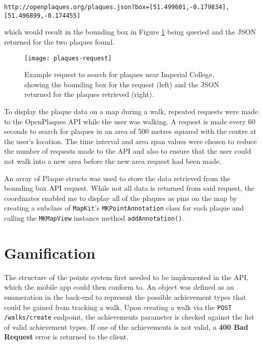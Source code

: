 \vspace{-0.5cm}
\begin{center}
  \verb|http://openplaques.org/plaques.json?box=[51.499601,-0.179834],[51.496899,-0.174455]|
\end{center}

which would result in the bounding box in Figure \ref{fig:plaques-request} being queried and the JSON returned for the two plaques found.

\begin{figure}[hbt]
  \centering
  \texttt{[image: plaques-request]}
  \caption{Example request to search for plaques near Imperial College, showing the bounding box for the request (left) and the JSON returned for the plaques retrieved (right).}
  \label{fig:plaques-request}
\end{figure}


To display the plaque data on a map during a walk, repeated requests were made to the OpenPlaques API while the user was walking. A request is made every 60 seconds to search for plaques in an area of 500 metres squared with the centre at the user's location. The time interval and area span values were chosen to reduce the number of requests made to the API and also to ensure that the user could not walk into a new area before the new area request had been made.

An array of Plaque structs was used to store the data retrieved from the bounding box API request. While not all data is returned from said request, the coordinates enabled me to display all of the plaques as pins on the map by creating a subclass of \verb|MapKit|'s \verb|MKPointAnnotation| class for each plaque and calling the \verb|MKMapView| instance method \verb|addAnnotation()|.


\section{Gamification} \label{subsection:gamification}

The structure of the points system first needed to be implemented in the API, which the mobile app could then conform to. An object was defined as an enumeration in the back-end to represent the possible achievement types that could be gained from tracking a walk. Upon creating a walk via the \texttt{POST /walks/create} endpoint, the achievements parameter is checked against the list of valid achievement types. If one of the achievements is not valid, a \textbf{400 Bad Request} error is returned to the client.

